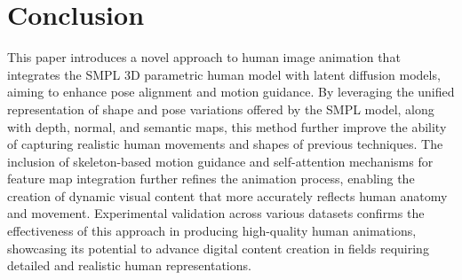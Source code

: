 \section{Conclusion}
\label{sec:conclusion}

This paper introduces a novel approach to human image animation that integrates the SMPL 3D parametric human model with latent diffusion models, aiming to enhance pose alignment and motion guidance. 
By leveraging the unified representation of shape and pose variations offered by the SMPL model, along with depth, normal, and semantic maps, this method further improve the ability of capturing realistic human movements and shapes of previous techniques.
The inclusion of skeleton-based motion guidance and self-attention mechanisms for feature map integration further refines the animation process, enabling the creation of dynamic visual content that more accurately reflects human anatomy and movement. 
Experimental validation across various datasets confirms the effectiveness of this approach in producing high-quality human animations, showcasing its potential to advance digital content creation in fields requiring detailed and realistic human representations.
